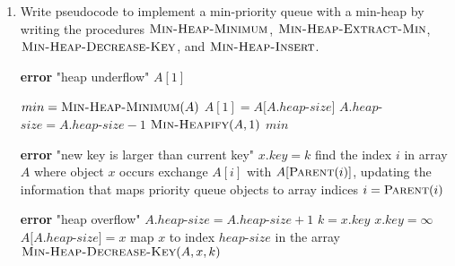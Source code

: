 \documentclass[12pt,reqno]{amsart}
\newif\ifanswer
\begin{document}
\begin{enumerate}[1.]
\item Write pseudocode to implement a min-priority queue with a min-heap by writing the procedures $\textsc{Min-Heap-Minimum}$, $\textsc{Min-Heap-Extract-Min}$, $\textsc{Min-Heap-Decrease-Key}$, and $\textsc{Min-Heap-Insert}$.

\ifanswer
{}
\begin{algorithm}
    \caption{$\textsc{Min-Heap-Minimum}(A)$}
    \begin{algorithmic}[1]
            \STATE \textbf{error} "heap underflow"
        \ENDIF
        \RETURN $A[1]$
    \end{algorithmic}
\end{algorithm}
\vspace{1cm}

\begin{algorithm}
    \caption{$\textsc{Min-Heap-Extract-Min}(A)$}
    \begin{algorithmic}[1]
        \STATE $min = \textsc{Min-Heap-Minimum}(A)$
        \STATE $A[1] = A[A.heap$-$size]$
        \STATE $A.heap$-$size = A.heap$-$size - 1$
        \STATE $\textsc{Min-Heapify}(A, 1)$
        \RETURN $min$
    \end{algorithmic}
\end{algorithm}
\vspace{1cm}

\begin{algorithm}
    \caption{$\textsc{Min-Heap-Decrease-Key}(A, x, k)$}
    \begin{algorithmic}[1]
            \STATE \textbf{error} "new key is larger than current key"
        \ENDIF
        \STATE $x.key = k$
        \STATE find the index $i$ in array $A$ where object $x$ occurs
            \STATE exchange $A[i]$ with $A[\textsc{Parent}(i)]$, updating the information that maps priority queue objects to array indices
            \STATE $i = \textsc{Parent}(i)$
        \ENDWHILE
    \end{algorithmic}
\end{algorithm}
\newpage

\begin{algorithm}
    \caption{$\textsc{Min-Heap-Insert}(A, x, n)$}
    \begin{algorithmic}[1]
            \STATE \textbf{error} "heap overflow"
        \ENDIF
        \STATE $A.heap$-$size = A.heap$-$size + 1$
        \STATE $k = x.key$
        \STATE $x.key = \infty$
        \STATE $A[A.heap$-$size] = x$
        \STATE map $x$ to index $heap$-$size$ in the array
        \STATE $\textsc{Min-Heap-Decrease-Key}(A, x, k)$
    \end{algorithmic}
\end{algorithm}
\vspace{1cm}




\end{enumerate}
\end{document}
